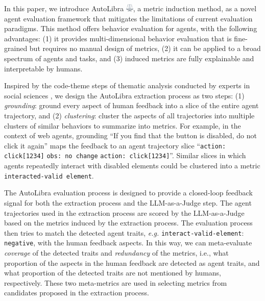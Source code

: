 In this paper, we introduce AutoLibra \protect\includegraphics[height=1em]{figs/scale.png},
a metric induction method, as a novel agent evaluation framework
that mitigates the limitations of current evaluation paradigms.
This method offers behavior evaluation for agents, with the following advantages:
(1) it provides multi-dimensional behavior evaluation that is fine-grained but requires no manual design of metrics, 
(2) it can be applied to a broad spectrum of agents and tasks, and
(3) induced metrics are fully explainable and interpretable by humans.



Inspired by the code-theme steps of thematic analysis conducted by experts
in social sciences \citep{braun2006using},
we design the AutoLibra extraction process as two steps:
(1) \emph{grounding}: ground every aspect of human feedback into a slice of the entire agent trajectory,
and (2) \emph{clustering}: cluster the aspects of all trajectories into multiple clusters of similar behaviors
to summarize into metrics. For example, in the context of web agents, grounding
``\textsf{If you find that the button is disabled, do not click it again}'' maps the feedback to an agent trajectory slice
``\texttt{action: click[1234]} \texttt{obs: no change} \texttt{action: click[1234]}''. Similar slices in which agents repeatedly interact with disabled elements could be clustered into a metric \texttt{ interacted-valid element}. 


The AutoLibra evaluation process is designed to provide a closed-loop feedback signal for both the extraction process
and the LLM-as-a-Judge step. The agent trajectories used in the extraction process are scored by the LLM-as-a-Judge based
on the metrics induced by the extraction process. The evaluation process then tries to match the detected agent traits,
\emph{e.g.} \texttt{interact-valid-element}: \texttt{negative}, with the human feedback aspects.
In this way, we can meta-evaluate \emph{coverage} of the detected traits and \emph{redundancy} of the metrics,
i.e., what proportion of the aspects in the human feedback are detected as agent traits,
and what proportion of the detected traits are not mentioned by humans, respectively. These two meta-metrics are used in selecting
metrics from candidates proposed in the extraction process.



